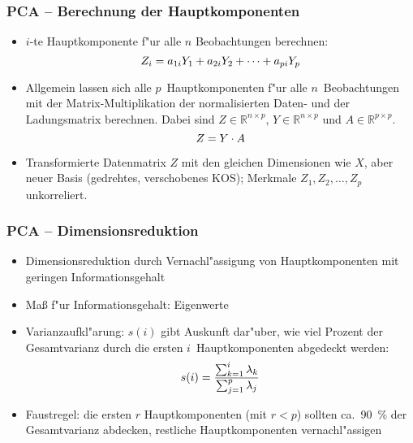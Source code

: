 
\begin{frame}

\frametitle{PCA -- Berechnung der Hauptkomponenten}

\begin{itemize}
\setlength{\itemsep}{5pt}
\item $i$-te Hauptkomponente f"ur alle $n$ Beobachtungen berechnen:
\begin{equation}
Z_i = a_{1i} Y_1 + a_{2i} Y_2 + \cdots + a_{pi} Y_p \notag
\end{equation}
\item Allgemein lassen sich alle $p$~Hauptkomponenten f"ur alle $n$~Beobachtungen mit der Matrix-Multiplikation der normalisierten Daten- und der Ladungsmatrix berechnen. Dabei sind $Z \in \mathbb{R}^{n \times p}$, $Y \in \mathbb{R}^{n \times p}$ und $A \in \mathbb{R}^{p \times p}$.
\begin{equation}
Z = Y \cdot A \notag
\end{equation}
\item Transformierte Datenmatrix $Z$ mit den gleichen Dimensionen wie $X$, aber neuer Basis (gedrehtes, verschobenes KOS); Merkmale $Z_1,Z_2,\ldots,Z_p$ unkorreliert.
\end{itemize}

\end{frame}







\begin{frame}

\frametitle{PCA -- Dimensionsreduktion}

\begin{itemize}
\setlength{\itemsep}{5pt}
\item Dimensionsreduktion durch Vernachl"assigung von Hauptkomponenten mit geringen Informationsgehalt
\item Ma{\ss} f"ur Informationsgehalt: Eigenwerte
\item Varianzaufkl"arung: $s(i)$ gibt Auskunft dar"uber, wie viel Prozent der Gesamtvarianz durch die ersten $i$~Hauptkomponenten abgedeckt werden:
\begin{equation}
s(i) = \frac{\sum \nolimits_{k=1}^i \lambda_k}{\sum \nolimits_{j=1}^p \lambda_j}  \notag
\end{equation}
\item Faustregel: die ersten $r$ Hauptkomponenten (mit $r<p$) sollten ca.~90~\% der Gesamtvarianz abdecken, restliche Hauptkomponenten vernachl"assigen
\end{itemize}

\end{frame}






